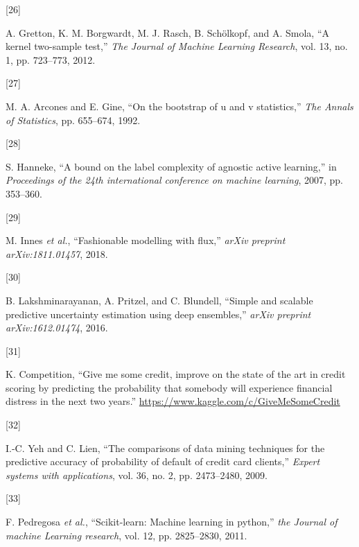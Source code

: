 \documentclass[
  conference]{IEEEtran}
\newlength{\cslhangindent}
\newlength{\csllabelwidth}
\newlength{\cslentryspacingunit} %
\newenvironment{CSLReferences}[2] %
 {%
  \setlength{\parindent}{0pt}
  \ifodd #1
  \let\oldpar\par
  \def\par{\hangindent=\cslhangindent\oldpar}
  \fi
  \setlength{\parskip}{#2\cslentryspacingunit}
 }%
 {}
\newcommand{\CSLLeftMargin}[1]{\parbox[t]{\csllabelwidth}{#1}}
\newcommand{\CSLRightInline}[1]{\parbox[t]{\linewidth - \csllabelwidth}{#1}\break}
\begin{document}
\begin{CSLReferences}{0}{0}
\leavevmode{}%
\CSLLeftMargin{{[}26{]} }%
\CSLRightInline{A. Gretton, K. M. Borgwardt, M. J. Rasch, B. Schölkopf,
and A. Smola, {``A kernel two-sample test,''} \emph{The Journal of
Machine Learning Research}, vol. 13, no. 1, pp. 723--773, 2012.}

\leavevmode{}%
\CSLLeftMargin{{[}27{]} }%
\CSLRightInline{M. A. Arcones and E. Gine, {``On the bootstrap of u and
v statistics,''} \emph{The Annals of Statistics}, pp. 655--674, 1992.}

\leavevmode{}%
\CSLLeftMargin{{[}28{]} }%
\CSLRightInline{S. Hanneke, {``A bound on the label complexity of
agnostic active learning,''} in \emph{Proceedings of the 24th
international conference on machine learning}, 2007, pp. 353--360.}

\leavevmode{}%
\CSLLeftMargin{{[}29{]} }%
\CSLRightInline{M. Innes \emph{et al.}, {``Fashionable modelling with
flux,''} \emph{arXiv preprint arXiv:1811.01457}, 2018.}

\leavevmode{}%
\CSLLeftMargin{{[}30{]} }%
\CSLRightInline{B. Lakshminarayanan, A. Pritzel, and C. Blundell,
{``Simple and scalable predictive uncertainty estimation using deep
ensembles,''} \emph{arXiv preprint arXiv:1612.01474}, 2016.}

\leavevmode{}%
\CSLLeftMargin{{[}31{]} }%
\CSLRightInline{K. Competition, {``Give me some credit, improve on the
state of the art in credit scoring by predicting the probability that
somebody will experience financial distress in the next two years.''}
\url{https://www.kaggle.com/c/GiveMeSomeCredit}}

\leavevmode{}%
\CSLLeftMargin{{[}32{]} }%
\CSLRightInline{I.-C. Yeh and C. Lien, {``The comparisons of data mining
techniques for the predictive accuracy of probability of default of
credit card clients,''} \emph{Expert systems with applications}, vol.
36, no. 2, pp. 2473--2480, 2009.}

\leavevmode{}%
\CSLLeftMargin{{[}33{]} }%
\CSLRightInline{F. Pedregosa \emph{et al.}, {``Scikit-learn: Machine
learning in python,''} \emph{the Journal of machine Learning research},
vol. 12, pp. 2825--2830, 2011.}


\end{CSLReferences}
\end{document}
